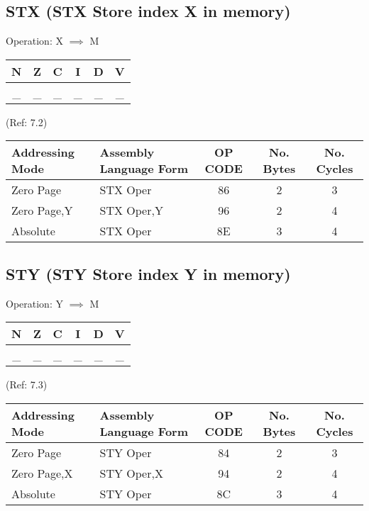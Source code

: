 \documentclass{article}
\begin{document}
  \subsection{STX (STX Store index X in memory)}
  Operation: X $\implies$ M
  \begin{table}[H]
  \centering
  \begin{tabular}{|c c c c c c|}
  \hline
  N&Z&C&I&D&V\\
  \hline
  \_ & \_ & \_ & \_ & \_ & \_\\
  \hline
  \end{tabular}
  \end{table}
                                 (Ref: 7.2)
  \begin{table}[H]
  \centering
  \begin{tabular}{|l|l|c|c|c|}
  \hline
    Addressing Mode& Assembly Language Form& OP CODE &No. Bytes&No. Cycles\\
  \hline
     Zero Page     &   STX Oper            &    86   &    2    &    3     \\
     Zero Page,Y   &   STX Oper,Y          &    96   &    2    &    4     \\
     Absolute      &   STX Oper            &    8E   &    3    &    4     \\
  \hline
  \end{tabular}
  \end{table}


  \subsection{STY (STY Store index Y in memory)}
  Operation: Y $\implies$ M
  \begin{table}[H]
  \centering
  \begin{tabular}{|c c c c c c|}
  \hline
  N&Z&C&I&D&V\\
  \hline
  \_ & \_ & \_ & \_ & \_ & \_\\
  \hline
  \end{tabular}
  \end{table}
                                 (Ref: 7.3)
  \begin{table}[H]
  \centering
  \begin{tabular}{|l|l|c|c|c|}
  \hline
    Addressing Mode& Assembly Language Form& OP CODE &No. Bytes&No. Cycles\\
  \hline
     Zero Page     &   STY Oper            &    84   &    2    &    3     \\
     Zero Page,X   &   STY Oper,X          &    94   &    2    &    4     \\
     Absolute      &   STY Oper            &    8C   &    3    &    4     \\
  \hline
  \end{tabular}
  \end{table}
\end{document}
